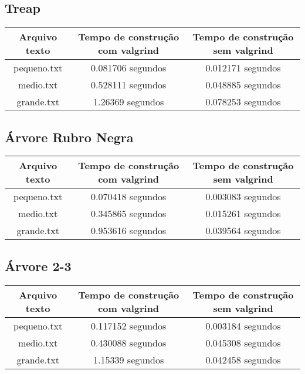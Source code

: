 \documentclass{article}
\begin{document}
\subsection{Treap}

\label{SampleTable}
\begin{tabular}[t]{|c|c|c|}
\hline
\textbf{Arquivo texto} & \textbf{Tempo de construção com valgrind} & \textbf{Tempo de construção sem valgrind} \\
\hline\hline
pequeno.txt & 0.081706 segundos & 0.012171 segundos\\
\hline
medio.txt & 0.528111 segundos &  0.048885 segundos\\
\hline
grande.txt & 1.26369 segundos & 0.078253 segundos \\
\hline
\end{tabular}

\subsection{Árvore Rubro Negra}

\label{SampleTable}
\begin{tabular}[t]{|c|c|c|}
\hline
\textbf{Arquivo texto} & \textbf{Tempo de construção com valgrind} & \textbf{Tempo de construção sem valgrind} \\
\hline\hline
pequeno.txt & 0.070418 segundos & 0.003083 segundos \\
\hline
medio.txt & 0.345865 segundos & 0.015261 segundos \\
\hline
grande.txt & 0.953616 segundos & 0.039564 segundos \\
\hline
\end{tabular}

\subsection{Árvore 2-3}

\label{SampleTable}
\begin{tabular}[t]{|c|c|c|}
\hline
\textbf{Arquivo texto} & \textbf{Tempo de construção com valgrind} & \textbf{Tempo de construção sem valgrind} \\
\hline\hline
pequeno.txt & 0.117152 segundos & 0.003184 segundos \\
\hline
medio.txt & 0.430088 segundos & 0.045308 segundos \\
\hline
grande.txt & 1.15339 segundos & 0.042458 segundos\\
\hline
\end{tabular}
\end{document}
